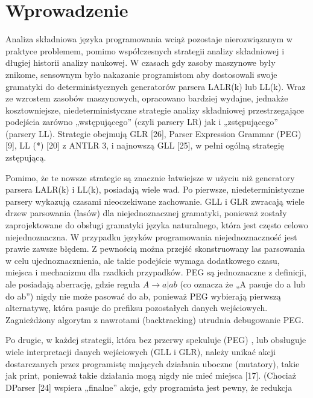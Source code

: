 \section{Wprowadzenie}
Analiza składniowa języka programowania wciąż pozostaje nierozwiązanym w praktyce problemem,
pomimo współczesnych strategii analizy składniowej i długiej historii analizy naukowej.
W czasach gdy zasoby maszynowe były znikome, sensownym było nakazanie programistom aby dostosowali
swoje gramatyki do deterministycznych generatorów parsera LALR(k) lub LL(k).\footnotemark[1]
Wraz ze wzrostem zasobów maszynowych, opracowano bardziej wydajne, jednakże kosztowniejsze,
niedeterministyczne strategie analizy składniowej przestrzegające podejścia zarówno „wstępującego”
(czyli parsery LR) jak i „zstępującego” (parsery LL).
Strategie obejmują GLR [26], Parser Expression Grammar (PEG) [9], LL (*) [20] z ANTLR 3,
i najnowszą GLL [25], w pełni ogólną strategię zstępującą.
\par
Pomimo, że te nowsze strategie są znacznie łatwiejsze w użyciu niż generatory parsera LALR(k) i LL(k),
posiadają wiele wad.
Po pierwsze, niedeterministyczne parsery wykazują czasami nieoczekiwane zachowanie.
GLL i GLR zwracają wiele drzew parsowania (lasów) dla niejednoznacznej gramatyki,
ponieważ zostały zaprojektowane do obsługi gramatyki języka naturalnego,
która jest często celowo niejednoznaczna.
W przypadku języków programowania niejednoznaczność jest prawie zawsze błędem.
Z pewnością można przejść skonstruowany las parsowania w celu ujednoznacznienia,
ale takie podejście wymaga dodatkowego czasu, miejsca i mechanizmu dla rzadkich przypadków. 
PEG są jednoznaczne z definicji, ale posiadają aberrację, gdzie reguła \(A \rightarrow a | ab\)
(co oznacza że „A pasuje do a lub do ab”) nigdy nie może pasować do ab, ponieważ
PEG wybierają pierwszą alternatywę, która pasuje do prefiksu pozostałych danych wejściowych.
Zagnieżdżony algorytm z nawrotami (backtracking) utrudnia debugowanie PEG. 
\par
Po drugie, w każdej strategii, która bez przerwy spekuluje (PEG) , lub obsługuje wiele interpretacji danych wejściowych
(GLL i GLR), należy unikać akcji dostarczanych przez programistę mających działania uboczne (mutatory),
takie jak print,  ponieważ takie działania mogą nigdy nie mieć miejsca [17].
(Chociaż DParser [24] wspiera „finalne” akcje, gdy programista jest pewny, że redukcja
